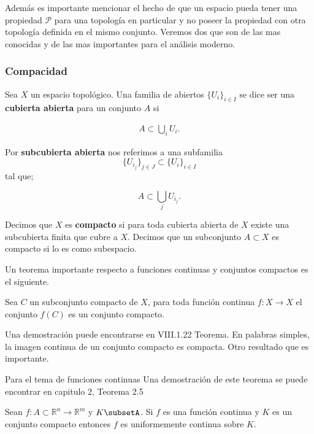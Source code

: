 Además es importante mencionar el hecho de que un espacio pueda tener una propiedad $\mathcal{P}$ para una topología en particular y no poseer la propiedad con otra topología definida en el mismo conjunto. Veremos dos que son de las mas conocidas y de las mas importantes para el análisis moderno. 

\subsubsection*{Compacidad}
\begin{df}
Sea $X$ un espacio topológico. Una familia de abiertos $\{U_i\}_{i \in I}$ se dice ser una \textbf{cubierta abierta} para un conjunto $A$ si 
	
\begin{align*}
A \subset \bigcup_i U_i.
\end{align*}

Por \textbf{subcubierta abierta} nos referimos a una subfamilia $$\{U_{i_j}\}_{j \in J} \subset \{U_i\}_{i \in I}$$ tal que;

$$ A \subset \bigcup_j U_{i_j}.$$

Decimos que $X$ es \textbf{compacto} si para toda cubierta abierta de $X$ existe una subcubierta finita que cubre a $X$. Decimos que un subconjunto $A \subset X$ es compacto si lo es como subespacio.


\end{df}

Un teorema importante respecto a funciones continuas y conjuntos compactos es el siguiente.
 
\begin{te}
Sea $C$ un subconjunto compacto de $X$, para toda función continua $f:X \to X$ el conjunto $f(C)$ es un conjunto compacto.
\end{te}

Una demostración puede encontrarse en \cite{top_prieto} VIII.1.22 Teorema. En palabras simples, la imagen continua de un conjunto compacto es compacta. Otro resultado que es importante.

Para el tema de funciones continuas Una demostración de este teorema se puede encontrar en capitulo 2, Teorema 2.5

\begin{te}
Sean $f:A \subset \mathbb{R}^n \to \mathbb{R}^m$ y $K \subsetA$. Si $f$ es una función continua y $K$ es un conjunto compacto entonces $f$ es uniformemente continua sobre $K$.

\end{te}
